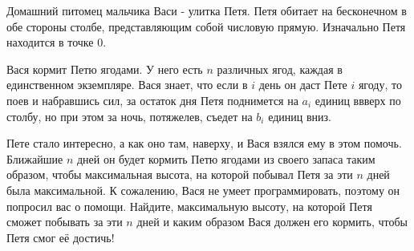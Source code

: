 Домашний питомец мальчика Васи - улитка Петя. Петя обитает на бесконечном в обе стороны столбе, представляющим собой числовую прямую. Изначально Петя находится в точке 0.

Вася кормит Петю ягодами. У него есть $n$ различных ягод, каждая в единственном экземпляре.
Вася знает, что если в $i$ день он даст Пете $i$ ягоду, то поев и набравшись сил, за остаток дня Петя поднимется на $a_i$ единиц ввверх по столбу, но при этом за ночь, потяжелев, съедет на $b_i$ единиц вниз.

Пете стало интересно, а как оно там, наверху, и Вася взялся ему в этом помочь. Ближайшие $n$ дней он будет кормить Петю ягодами из своего запаса таким образом, чтобы максимальная высота, на которой побывал Петя за эти $n$ дней была максимальной. К сожалению, Вася не умеет программировать, поэтому он попросил вас о помощи. Найдите, максимальную высоту, на которой Петя сможет побывать за эти $n$ дней и каким образом Вася должен его кормить, чтобы Петя смог её достичь!